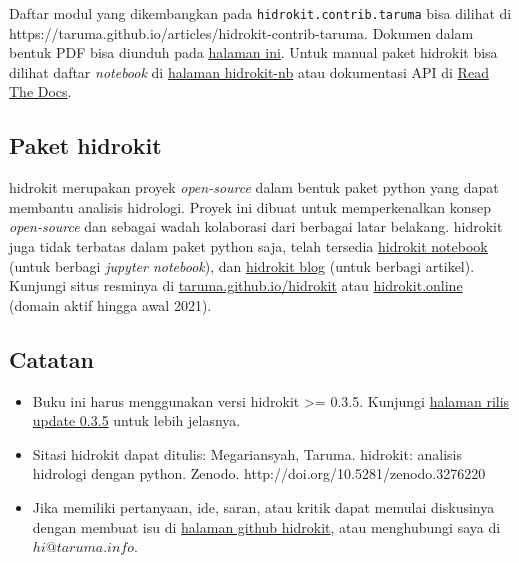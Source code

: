 \documentclass[11pt]{article}
\providecommand{\tightlist}{%
      \setlength{\itemsep}{0pt}\setlength{\parskip}{0pt}}
\begin{document}
Daftar modul yang dikembangkan pada \texttt{hidrokit.contrib.taruma}
bisa dilihat di
https://taruma.github.io/articles/hidrokit-contrib-taruma. Dokumen dalam
bentuk PDF bisa diunduh pada
\href{https://1drv.ms/u/s!AmxSTa4UunElhoUQEzIaYJDj-NYiRQ?e=4Vay43}{halaman
ini}. Untuk manual paket hidrokit bisa dilihat daftar \emph{notebook} di
\href{https://taruma.github.io/hidrokit-nb/kumpulan-notebook\#hidrokit-}{halaman
hidrokit-nb} atau dokumentasi API di
\href{https://hidrokit.readthedocs.io/en/stable/}{Read The Docs}.

\hypertarget{paket-hidrokit}{%
\subsection{Paket hidrokit}\label{paket-hidrokit}}

hidrokit merupakan proyek \emph{open-source} dalam bentuk paket python
yang dapat membantu analisis hidrologi. Proyek ini dibuat untuk
memperkenalkan konsep \emph{open-source} dan sebagai wadah kolaborasi
dari berbagai latar belakang. hidrokit juga tidak terbatas dalam paket
python saja, telah tersedia
\href{https://taruma.github.io/hidrokit-nb}{hidrokit notebook} (untuk
berbagi \emph{jupyter notebook}), dan
\href{https://taruma.github.io/hidrokit-blog}{hidrokit blog} (untuk
berbagi artikel). Kunjungi situs resminya di
\href{https://taruma.github.io/hidrokit}{taruma.github.io/hidrokit} atau
\href{https://taruma.github.io/hidrokit}{hidrokit.online} (domain aktif
hingga awal 2021).

\hypertarget{catatan}{%
\subsection{Catatan}\label{catatan}}

\begin{itemize}
\tightlist
\item
  Buku ini harus menggunakan versi hidrokit \textgreater{}= 0.3.5.
  Kunjungi
  \href{https://github.com/taruma/hidrokit/releases/tag/0.3.5}{halaman
  rilis update 0.3.5} untuk lebih jelasnya.
\item
  Sitasi hidrokit dapat ditulis: Megariansyah, Taruma. hidrokit:
  analisis hidrologi dengan python. Zenodo.
  http://doi.org/10.5281/zenodo.3276220
\item
  Jika memiliki pertanyaan, ide, saran, atau kritik dapat memulai
  diskusinya dengan membuat isu di
  \href{https://github.com/taruma/hidrokit/issues}{halaman github
  hidrokit}, atau menghubungi saya di \(hi@taruma.info\).
\end{itemize}
\end{document}
